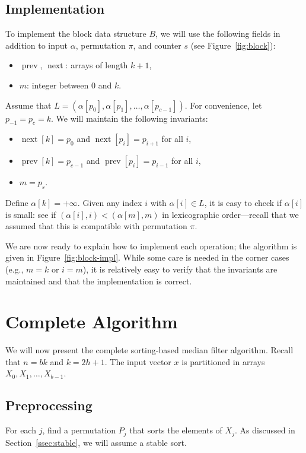 \documentclass[a4paper,11pt]{article}
\DeclareMathOperator{\prev}{prev}
\DeclareMathOperator{\next}{next}
\begin{document}
\subsection{Implementation}

To implement the block data structure $B$, we will use the following fields in addition to input $\alpha$, permutation $\pi$, and counter $s$ (see Figure~\ref{fig:block}):
\begin{itemize}[noitemsep]
    \item $\prev$, $\next$: arrays of length $k+1$,
    \item $m$: integer between $0$ and $k$.
\end{itemize}
Assume that $L = (\alpha[p_0], \alpha[p_1], \dotsc, \alpha[p_{c-1}])$. For convenience, let $p_{-1} = p_c = k$. We will maintain the following invariants:
\begin{itemize}[noitemsep]
    \item $\next[k] = p_0$ and $\next[p_i] = p_{i+1}$ for all $i$,
    \item $\prev[k] = p_{c-1}$ and $\prev[p_i] = p_{i-1}$ for all $i$,
    \item $m = p_s$.
\end{itemize}
Define $\alpha[k] = +\infty$. Given any index $i$ with $\alpha[i] \in L$, it is easy to check if $\alpha[i]$ is small: see if
$
    (\alpha[i], i) < (\alpha[m], m)
$
in lexicographic order---recall that we assumed that this is compatible with permutation $\pi$.

We are now ready to explain how to implement each operation; the algorithm is given in Figure~\ref{fig:block-impl}. While some care is needed in the corner cases (e.g., $m = k$ or $i = m$), it is relatively easy to verify that the invariants are maintained and that the implementation is correct.

\section{Complete Algorithm}\label{sec:alg}

We will now present the complete sorting-based median filter algorithm. Recall that $n = bk$ and $k = 2h + 1$. The input vector $x$ is partitioned in arrays $X_0, X_1, \dotsc, X_{b-1}$. 

\subsection{Preprocessing}

For each $j$, find a permutation $P_j$ that sorts the elements of $X_j$. As discussed in Section~\ref{ssec:stable}, we will assume a stable sort.
\end{document}
